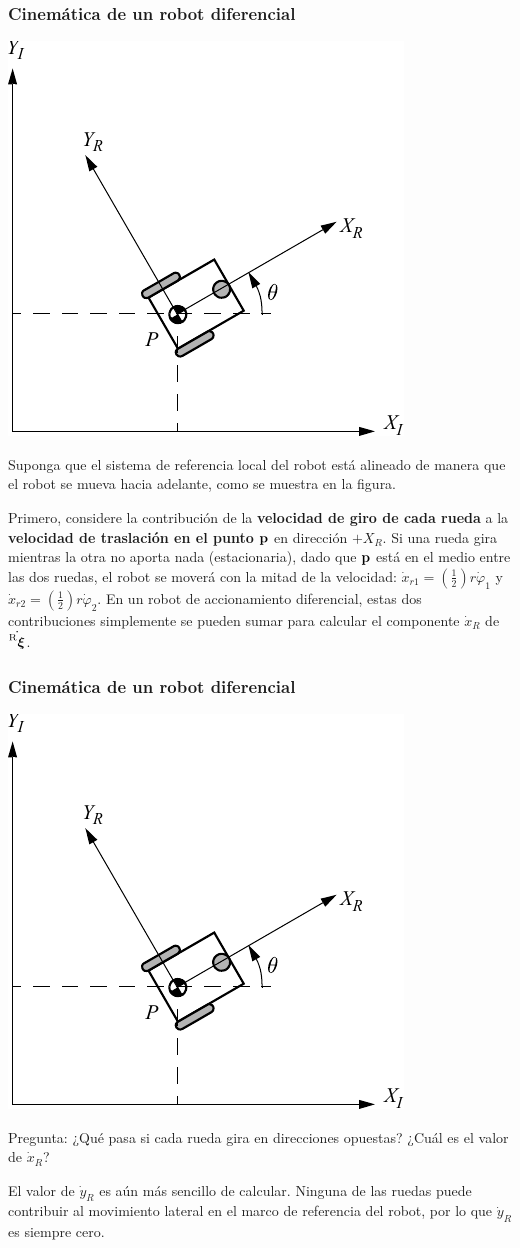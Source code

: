 \begin{frame}
    \frametitle{Cinemática de un robot diferencial}
    \footnotesize
    \begin{center}
        \includegraphics[width=0.3\columnwidth]{./images/coordinate_systems.pdf}
    \end{center}
    Suponga que el sistema de referencia local del robot está alineado de manera que el robot se mueva hacia adelante, como se muestra en la figura.
    
    Primero, considere la contribución de la {\bf velocidad de giro de cada rueda} a la {\bf velocidad de traslación en el punto $\boldsymbol{\mathbf{p}}$} en dirección $+X_{R}$. Si una rueda gira mientras la otra no aporta nada (estacionaria), dado que $\boldsymbol{\mathbf{p}}$ está en el medio entre las dos ruedas, el robot se moverá con la mitad de la velocidad: $\dot{x}_{r1} = \left(\frac{1}{2}\right)r\dot{\varphi}_{1}$ y $ \dot{x}_{r2} = \left(\frac{1}{2}\right)r\dot{\varphi}_{2}$. En un robot de accionamiento diferencial, estas dos contribuciones simplemente se pueden sumar para calcular el componente $\dot{x}_{R}$ de $\dot{\prescript{\mathrm{R}}{}{{\boldsymbol{\mathbf{\xi}}}_\mathrm{}}}$.
\end{frame}

\begin{frame}
    \frametitle{Cinemática de un robot diferencial}
    \footnotesize
    \begin{center}
        \includegraphics[width=0.3\columnwidth]{./images/coordinate_systems.pdf}
    \end{center}
    
    Pregunta: ¿Qué pasa si cada rueda gira en direcciones opuestas? ¿Cuál es el valor de $\dot{x}_{R}$?
 


    
    El valor de $\dot{y}_{R}$ es aún más sencillo de calcular. Ninguna de las ruedas puede contribuir al movimiento lateral en el marco de referencia del robot, por lo que $\dot{y}_{R}$ es siempre cero.
\end{frame}

